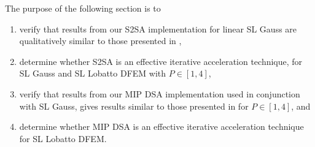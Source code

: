 The purpose of the following section is to 
\begin{enumerate}
\item verify that results from our S2SA implementation for linear SL Gauss are qualitatively similar to those presented in \cite{s2sa},
\item determine whether S2SA is an effective iterative acceleration technique, for SL Gauss and SL Lobatto DFEM with $P \in[1,4]$,
\item verify that results from our MIP DSA implementation used in conjunction with SL Gauss, gives results similar to those presented in \cite{mip_dsa} for $P\in[1,4]$, and 
\item  determine whether MIP DSA is an effective iterative acceleration technique for SL Lobatto DFEM.
\end{enumerate}

